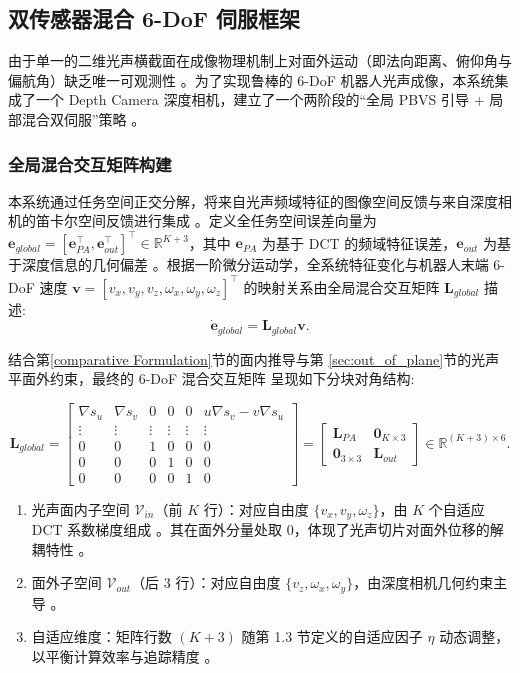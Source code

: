 \documentclass{article}
\begin{document}
\subsection{双传感器混合 6-DoF 伺服框架}
由于单一的二维光声横截面在成像物理机制上对面外运动（即法向距离、俯仰角与偏航角）缺乏唯一可观测性 。为了实现鲁棒的 6-DoF 机器人光声成像，本系统集成了一个 Depth Camera 深度相机，建立了一个两阶段的“全局 PBVS 引导 + 局部混合双伺服”策略 。


\subsubsection{全局混合交互矩阵构建}

本系统通过任务空间正交分解，将来自光声频域特征的图像空间反馈与来自深度相机的笛卡尔空间反馈进行集成 。定义全任务空间误差向量为 $\mathbf{e}_{global} = [\mathbf{e}_{PA}^\top, \mathbf{e}_{out}^\top]^\top \in \mathbb{R}^{K+3}$，其中 $\mathbf{e}_{PA}$ 为基于 DCT 的频域特征误差，$\mathbf{e}_{out}$ 为基于深度信息的几何偏差 。根据一阶微分运动学，全系统特征变化与机器人末端 6-DoF 速度 $\mathbf{v} = [v_x, v_y, v_z, \omega_x, \omega_y, \omega_z]^\top$ 的映射关系由全局混合交互矩阵 $\mathbf{L}_{global}$ 描述: 
\begin{equation}
    \dot{\mathbf{e}}_{global} = \mathbf{L}_{global} \mathbf{v}.
\end{equation}

结合第\cref{comparative Formulation}节的面内推导与第 \cref{sec:out_of_plane}节的光声平面外约束，最终的 6-DoF 混合交互矩阵 呈现如下分块对角结构:

\begin{equation}
    \mathbf{L}_{global} = \begin{bmatrix} \nabla s_{u} & \nabla s_{v} & 0 & 0 & 0 & u\nabla s_{v} - v\nabla s_{u} \\ \vdots & \vdots & \vdots & \vdots & \vdots & \vdots \\ 0 & 0 & 1 & 0 & 0 & 0 \\ 0 & 0 & 0 & 1 & 0 & 0 \\ 0 & 0 & 0 & 0 & 1 & 0 \end{bmatrix} = \begin{bmatrix} \mathbf{L}_{PA} & \mathbf{0}_{K \times 3} \\ \mathbf{0}_{3 \times 3} & \mathbf{L}_{out} \end{bmatrix} \in \mathbb{R}^{(K+3) \times 6}.
\end{equation}

\begin{enumerate}
    \item 光声面内子空间 $\mathcal{V}_{in}$（前 $K$ 行）：对应自由度 $\{v_x, v_y, \omega_z\}$，由 $K$ 个自适应 DCT 系数梯度组成 。其在面外分量处取 0，体现了光声切片对面外位移的解耦特性 。
\item 面外子空间 $\mathcal{V}_{out}$（后 3 行）：对应自由度 $\{v_z, \omega_x, \omega_y\}$，由深度相机几何约束主导 。
\item 自适应维度：矩阵行数 $(K+3)$ 随第 1.3 节定义的自适应因子 $\eta$ 动态调整，以平衡计算效率与追踪精度 。
\end{enumerate}
\end{document}
